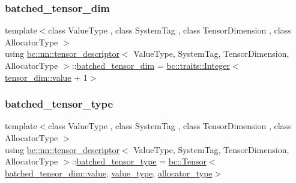 \mbox{\label{structbc_1_1nn_1_1tensor__descriptor_a063563a739f9139ae7bc654d2c5aa983}} 
\subsubsection{\texorpdfstring{batched\+\_\+tensor\+\_\+dim}{batched\_tensor\_dim}}
{\footnotesize\ttfamily template$<$class Value\+Type , class System\+Tag , class Tensor\+Dimension , class Allocator\+Type $>$ \\
using \hyperlink{structbc_1_1nn_1_1tensor__descriptor}{bc\+::nn\+::tensor\+\_\+descriptor}$<$ Value\+Type, System\+Tag, Tensor\+Dimension, Allocator\+Type $>$\+::\hyperlink{structbc_1_1nn_1_1tensor__descriptor_a063563a739f9139ae7bc654d2c5aa983}{batched\+\_\+tensor\+\_\+dim} =  \hyperlink{structbc_1_1traits_1_1Integer}{bc\+::traits\+::\+Integer}$<$\hyperlink{structbc_1_1traits_1_1Integer_a853b05936b98e64c79163395c3624e32}{tensor\+\_\+dim\+::value} + 1$>$}

\mbox{\label{structbc_1_1nn_1_1tensor__descriptor_a8220be14af61131bfc16d83eabe75022}} 
\subsubsection{\texorpdfstring{batched\+\_\+tensor\+\_\+type}{batched\_tensor\_type}}
{\footnotesize\ttfamily template$<$class Value\+Type , class System\+Tag , class Tensor\+Dimension , class Allocator\+Type $>$ \\
using \hyperlink{structbc_1_1nn_1_1tensor__descriptor}{bc\+::nn\+::tensor\+\_\+descriptor}$<$ Value\+Type, System\+Tag, Tensor\+Dimension, Allocator\+Type $>$\+::\hyperlink{structbc_1_1nn_1_1tensor__descriptor_a8220be14af61131bfc16d83eabe75022}{batched\+\_\+tensor\+\_\+type} =  \hyperlink{namespacebc_a659391e47ab612be3ba6c18cf9c89159}{bc\+::\+Tensor}$<$ \hyperlink{structbc_1_1traits_1_1Integer_a853b05936b98e64c79163395c3624e32}{batched\+\_\+tensor\+\_\+dim\+::value}, \hyperlink{structbc_1_1nn_1_1tensor__descriptor_a50cff589c12e4da21525c0ebb04dc54d}{value\+\_\+type}, \hyperlink{structbc_1_1nn_1_1tensor__descriptor_aeca4d7720d1a19acea4d9166e3af80a3}{allocator\+\_\+type}$>$}

